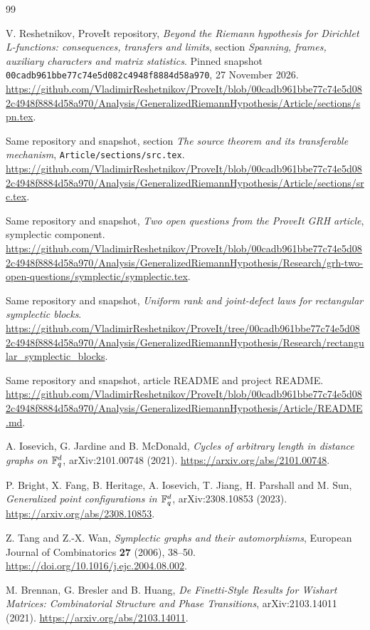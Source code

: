 \begin{thebibliography}{99}
\raggedright
{}
V. Reshetnikov, ProveIt repository,
\emph{Beyond the Riemann hypothesis for Dirichlet L-functions:
consequences, transfers and limits}, section
\emph{Spanning, frames, auxiliary characters and matrix statistics}.
Pinned snapshot \texttt{00cadb961bbe77c74e5d082c4948f8884d58a970},
27 November 2026.
\url{https://github.com/VladimirReshetnikov/ProveIt/blob/00cadb961bbe77c74e5d082c4948f8884d58a970/Analysis/GeneralizedRiemannHypothesis/Article/sections/spn.tex}.

Same repository and snapshot, section \emph{The source theorem and its
transferable mechanism}, \texttt{Article/sections/src.tex}.
\url{https://github.com/VladimirReshetnikov/ProveIt/blob/00cadb961bbe77c74e5d082c4948f8884d58a970/Analysis/GeneralizedRiemannHypothesis/Article/sections/src.tex}.

Same repository and snapshot, \emph{Two open questions from the ProveIt GRH
article}, symplectic component.
\url{https://github.com/VladimirReshetnikov/ProveIt/blob/00cadb961bbe77c74e5d082c4948f8884d58a970/Analysis/GeneralizedRiemannHypothesis/Research/grh-two-open-questions/symplectic/symplectic.tex}.

Same repository and snapshot, \emph{Uniform rank and joint-defect laws for
rectangular symplectic blocks}.
\url{https://github.com/VladimirReshetnikov/ProveIt/tree/00cadb961bbe77c74e5d082c4948f8884d58a970/Analysis/GeneralizedRiemannHypothesis/Research/rectangular_symplectic_blocks}.

Same repository and snapshot, article README and project README.
\url{https://github.com/VladimirReshetnikov/ProveIt/blob/00cadb961bbe77c74e5d082c4948f8884d58a970/Analysis/GeneralizedRiemannHypothesis/Article/README.md}.

A. Iosevich, G. Jardine and B. McDonald,
\emph{Cycles of arbitrary length in distance graphs on $\mathbb F_q^d$},
arXiv:2101.00748 (2021).
\url{https://arxiv.org/abs/2101.00748}.

P. Bright, X. Fang, B. Heritage, A. Iosevich, T. Jiang, H. Parshall and M. Sun,
\emph{Generalized point configurations in $\mathbb F_q^d$},
arXiv:2308.10853 (2023).
\url{https://arxiv.org/abs/2308.10853}.

Z. Tang and Z.-X. Wan,
\emph{Symplectic graphs and their automorphisms},
European Journal of Combinatorics \textbf{27} (2006), 38--50.
\url{https://doi.org/10.1016/j.ejc.2004.08.002}.

M. Brennan, G. Bresler and B. Huang,
\emph{De Finetti-Style Results for Wishart Matrices: Combinatorial Structure
and Phase Transitions}, arXiv:2103.14011 (2021).
\url{https://arxiv.org/abs/2103.14011}.
\end{thebibliography}

